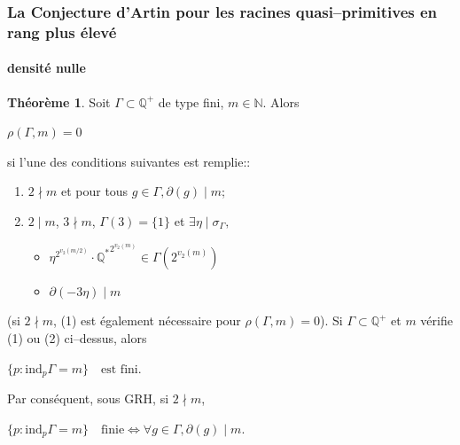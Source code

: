 \documentclass[10pt,handout]{beamer} %
\newcommand{\Q}{\mathbb Q}
\newcommand{\N}{\mathbb N}
\theoremstyle{definition}
\newtheorem{theoreme}[theorem]{{Th\'eor\`eme}}
\begin{document}
\begin{frame}
\frametitle{La Conjecture d'Artin pour les racines quasi--primitives en rang plus \'elev\'e}
\framesubtitle{densit\'e nulle}

\begin{theoreme}\label{finite} Soit $\Gamma\subset\Q^+$ de type fini, $m\in\N$. Alors
\\
\centerline{$\rho(\Gamma,m)=0$}


si l'une des conditions suivantes est remplie::
\begin{enumerate}
 \item $2\nmid m$ et pour tous $g\in\Gamma, \partial(g)\mid m$;
 \item $2\mid m$, $3\nmid m$, $\Gamma(3)=\{1\}$ et $\exists \eta\mid\sigma_\Gamma,$
\hspace*{4cm} \begin{minipage}{5cm}\begin{itemize}
 \item $\eta^{2^{v_2(m/2)}}\!\!\!\!\cdot{\Q^*}^{2^{v_2(m)}}\in\Gamma(2^{v_2(m)})$
 \item $\partial(-3\eta)\mid m$ %
 \end{itemize}\end{minipage}
 \end{enumerate}
(si $2\nmid m$, (1) est \'egalement n\'ecessaire pour $\rho(\Gamma,m)=0$).
Si $\Gamma\subset\Q^+$ et $m$ v\'erifie (1) ou (2) ci--dessus, alors\\
\centerline{$\{p: \text{ind}_p\Gamma=m\}\quad\text{est fini}.$}

Par cons\'equent, sous GRH, si $2\nmid m$,\\
\centerline{$\{p: \text{ind}_p\Gamma=m\}\quad\text{finie} \Longleftrightarrow \forall g\in\Gamma, \partial(g)\mid m.$}
\end{theoreme}
\end{frame}
\end{document}
